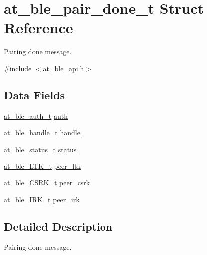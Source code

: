 \hypertarget{structat__ble__pair__done__t}{}\section{at\+\_\+ble\+\_\+pair\+\_\+done\+\_\+t Struct Reference}
\label{structat__ble__pair__done__t}


Pairing done message.  




{\ttfamily \#include $<$at\+\_\+ble\+\_\+api.\+h$>$}

\subsection*{Data Fields}
\begin{DoxyCompactItemize}
\item 
\mbox{\hyperlink{at__ble__api_8h_a70253ec09a2361d16e15c37f8cb5b97c}{at\+\_\+ble\+\_\+auth\+\_\+t}} \mbox{\hyperlink{structat__ble__pair__done__t_a448fd64ada655e5776d881e1a89f4f18}{auth}}
\item 
\mbox{\hyperlink{at__ble__api_8h_abd23646d0c662860741f787efc8456f2}{at\+\_\+ble\+\_\+handle\+\_\+t}} \mbox{\hyperlink{structat__ble__pair__done__t_ab8b0f353cb6a8d85f0822900e3b7cf35}{handle}}
\item 
\mbox{\hyperlink{group__error__codes__group_ga3b1db9b95feb157b3c188ca27fe76988}{at\+\_\+ble\+\_\+status\+\_\+t}} \mbox{\hyperlink{structat__ble__pair__done__t_a0b48093fc2030779fc47e5216f8019e2}{status}}
\item 
\mbox{\hyperlink{structat__ble___l_t_k__t}{at\+\_\+ble\+\_\+\+L\+T\+K\+\_\+t}} \mbox{\hyperlink{structat__ble__pair__done__t_abeffd33020743cbfbcba6531551aba44}{peer\+\_\+ltk}}
\item 
\mbox{\hyperlink{structat__ble___c_s_r_k__t}{at\+\_\+ble\+\_\+\+C\+S\+R\+K\+\_\+t}} \mbox{\hyperlink{structat__ble__pair__done__t_ae5e3e0e5e1ab67388d3a3a99ab2976cf}{peer\+\_\+csrk}}
\item 
\mbox{\hyperlink{structat__ble___i_r_k__t}{at\+\_\+ble\+\_\+\+I\+R\+K\+\_\+t}} \mbox{\hyperlink{structat__ble__pair__done__t_aff0900404319c23676c2d05f1e38e616}{peer\+\_\+irk}}
\end{DoxyCompactItemize}


\subsection{Detailed Description}
Pairing done message. 

